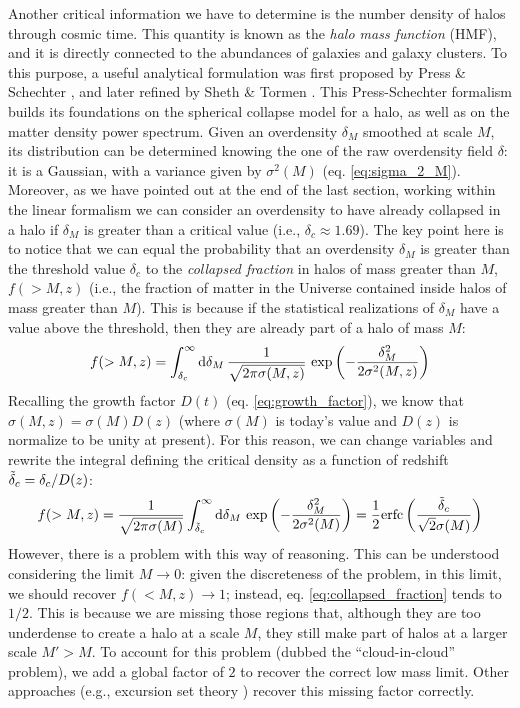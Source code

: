   Another critical information we have to determine is the number density of halos through cosmic time. This quantity is known as the \textit{halo mass function} (HMF), and it is directly connected to the abundances of galaxies and galaxy clusters. To this purpose, a useful analytical formulation was first proposed by Press \& Schechter \citep{press_schechter}, and later refined by Sheth \& Tormen \citep{sheth1999large}. This Press-Schechter formalism builds its foundations on the spherical collapse model for a halo, as well as on the matter density power spectrum. Given an overdensity $\delta_M$ smoothed at scale $M$, its distribution can be determined knowing the one of the raw overdensity field $\delta$: it is a Gaussian, with a variance given by $\sigma^2(M)$ (eq. \ref{eq:sigma_2_M}). Moreover, as we have pointed out at the end of the last section, working within the linear formalism we can consider an overdensity to have already collapsed in a halo if $\delta_M$ is greater than a critical value (i.e., $\delta_c\approx1.69$). The key point here is to notice that we can equal the probability that an overdensity $\delta_M$ is greater than the threshold value $\delta_c$ to the \textit{collapsed fraction} in halos of mass greater than $M$, $f(>M,z)$ (i.e., the fraction of matter in the Universe contained inside halos of mass greater than $M$). This is because if the statistical realizations of $\delta_M$ have a value above the threshold, then they are already part of a halo of mass $M$:
  \begin{align}
    f(>M,z) = \int_{\delta_c}^\infty \mathrm{d} \delta_M\, \frac{1}{\sqrt{2\pi \sigma(M,z)}}\, \exp\left(-\frac{\delta_M^2}{2\sigma^2(M,z)}\right)
 \end{align}
 Recalling the growth factor $D(t)$ (eq. \ref{eq:growth_factor}), we know that $\sigma(M,z) = \sigma(M)D(z)$ (where $\sigma(M)$ is today's value and $D(z)$ is normalize to be unity at present). For this reason, we can change variables and rewrite the integral defining the critical density as a function of redshift $\Tilde{\delta}_c = \delta_c / D(z)$:
  \begin{align}
   f(>M,z) = \frac{1}{\sqrt{2\pi \sigma(M)}}\int_{\tilde{\delta}_c}^\infty \mathrm{d} \delta_M\, \exp\left(-\frac{\delta_M^2}{2\sigma^2(M)}\right) = \frac{1}{2}\mathrm{erfc}\left(\frac{\tilde{\delta}_c}{\sqrt{2}\sigma(M)}\right) \label{eq:collapsed_fraction}
 \end{align}
 However, there is a problem with this way of reasoning. This can be understood considering the limit $M\rightarrow0$: given the discreteness of the problem, in this limit, we should recover $f(<M,z)\rightarrow1$; instead, eq. \ref{eq:collapsed_fraction} tends to $1/2$. This is because we are missing those regions that, although they are too underdense to create a halo at a scale $M$, they still make part of halos at a larger scale $M'>M$. To account for this problem (dubbed the “cloud-in-cloud” problem), we add a global factor of $2$ to recover the correct low mass limit. Other approaches (e.g., excursion set theory \citep{excursion_set_theory}) recover this missing factor correctly.
 
